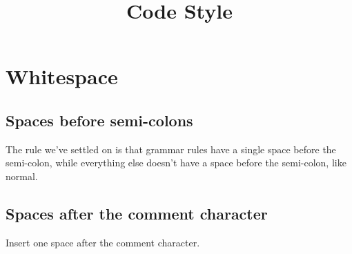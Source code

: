 \documentclass[12pt, notitlepage]{article}
\begin{document}
\title{Code Style}\author{}\date{}\maketitle

\section{Whitespace}

\subsection{Spaces before semi-colons}
The rule we've settled on is that grammar rules have a single space before the semi-colon, while everything else doesn't have a space before the semi-colon, like normal.
\subsection{Spaces after the comment character}
Insert one space after the comment character.
\end{document}
